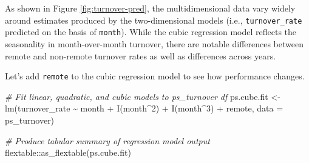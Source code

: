 \documentclass[
]{book}
\newenvironment{Shaded}{\begin{snugshade}}{\end{snugshade}}
\newcommand{\AttributeTok}[1]{\textcolor[rgb]{0.77,0.63,0.00}{#1}}
\newcommand{\CommentTok}[1]{\textcolor[rgb]{0.56,0.35,0.01}{\textit{#1}}}
\newcommand{\DecValTok}[1]{\textcolor[rgb]{0.00,0.00,0.81}{#1}}
\newcommand{\FunctionTok}[1]{\textcolor[rgb]{0.00,0.00,0.00}{#1}}
\newcommand{\NormalTok}[1]{#1}
\newcommand{\OtherTok}[1]{\textcolor[rgb]{0.56,0.35,0.01}{#1}}
\newcommand{\SpecialCharTok}[1]{\textcolor[rgb]{0.00,0.00,0.00}{#1}}
\begin{document}
As shown in Figure \ref{fig:turnover-pred}, the multidimensional data vary widely around estimates produced by the two-dimensional models (i.e., \texttt{turnover\_rate} predicted on the basis of \texttt{month}). While the cubic regression model reflects the seasonality in month-over-month turnover, there are notable differences between remote and non-remote turnover rates as well as differences across years.

Let's add \texttt{remote} to the cubic regression model to see how performance changes.

\begin{Shaded}
\begin{Highlighting}[]
\CommentTok{\# Fit linear, quadratic, and cubic models to ps\_turnover df}
\NormalTok{ps.cube.fit }\OtherTok{\textless{}{-}} \FunctionTok{lm}\NormalTok{(turnover\_rate }\SpecialCharTok{\textasciitilde{}}\NormalTok{ month }\SpecialCharTok{+} \FunctionTok{I}\NormalTok{(month}\SpecialCharTok{\^{}}\DecValTok{2}\NormalTok{) }\SpecialCharTok{+} \FunctionTok{I}\NormalTok{(month}\SpecialCharTok{\^{}}\DecValTok{3}\NormalTok{) }\SpecialCharTok{+}\NormalTok{ remote, }\AttributeTok{data =}\NormalTok{ ps\_turnover)}

\CommentTok{\# Produce tabular summary of regression model output}
\NormalTok{flextable}\SpecialCharTok{::}\FunctionTok{as\_flextable}\NormalTok{(ps.cube.fit)}
\end{Highlighting}
\end{Shaded}

\providecommand{\docline}[3]{\noalign{\global\setlength{\arrayrulewidth}{#1}}\arrayrulecolor[HTML]{#2}\cline{#3}}

\setlength{\tabcolsep}{2pt}

\renewcommand*{\arraystretch}{1.5}
\end{document}

